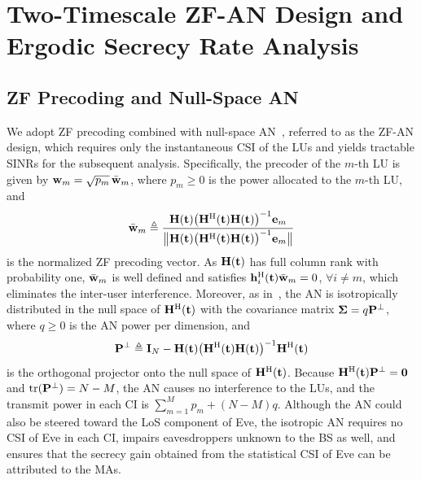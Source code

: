 \documentclass[journal]{IEEEtran}
\newcommand{\rev}[1]{{\color{red}#1}}
\newcommand{\rev}[1]{#1}
\begin{document}
\section{Two-Timescale ZF-AN Design and Ergodic Secrecy Rate Analysis}\label{sec:analysis}

\subsection{ZF Precoding and Null-Space AN}\label{sec:zfan}

We adopt ZF precoding combined with null-space AN~\cite{Zhou2010,ZhuTWC2014}, referred to as the ZF-AN design, which requires only the instantaneous CSI of the LUs and yields tractable SINRs for the subsequent analysis. Specifically, the precoder of the $m$-th LU is given by $\mathbf{w}_m=\sqrt{p_m}\,\bar{\mathbf{w}}_m$, where $p_m\ge0$ is the power allocated to the $m$-th LU, and
\begin{equation}\label{eq:zf}
\bar{\mathbf{w}}_m\triangleq\frac{\mathbf{H}(\mathbf{t})\big(\mathbf{H}^{\mathrm H}(\mathbf{t})\mathbf{H}(\mathbf{t})\big)^{-1}\mathbf{e}_m}{\big\|\mathbf{H}(\mathbf{t})\big(\mathbf{H}^{\mathrm H}(\mathbf{t})\mathbf{H}(\mathbf{t})\big)^{-1}\mathbf{e}_m\big\|}
\end{equation}
is the normalized ZF precoding vector. As $\mathbf{H}(\mathbf{t})$ has full column rank with probability one, $\bar{\mathbf{w}}_m$ is well defined and satisfies $\mathbf{h}_i^{\mathrm H}(\mathbf{t})\bar{\mathbf{w}}_m=0$, $\forall i\neq m$, which eliminates the inter-user interference. Moreover, as in~\cite{Zhou2010,ZhuTWC2014}, the AN is isotropically distributed in the null space of $\mathbf{H}^{\mathrm H}(\mathbf{t})$ with the covariance matrix $\boldsymbol{\Sigma}=q\mathbf{P}^{\perp}$, where $q\ge0$ is the AN power per dimension, and
\begin{equation}\label{eq:an}
\mathbf{P}^{\perp}\triangleq\mathbf{I}_N-\mathbf{H}(\mathbf{t})\big(\mathbf{H}^{\mathrm H}(\mathbf{t})\mathbf{H}(\mathbf{t})\big)^{-1}\mathbf{H}^{\mathrm H}(\mathbf{t})
\end{equation}
is the orthogonal projector onto the null space of $\mathbf{H}^{\mathrm H}(\mathbf{t})$. Because $\mathbf{H}^{\mathrm H}(\mathbf{t})\mathbf{P}^{\perp}=\mathbf 0$ and $\mathrm{tr}(\mathbf{P}^{\perp})=N-M$, the AN causes no interference to the LUs, and the transmit power in each CI is $\sum_{m=1}^Mp_m+(N-M)q$. \rev{Although the AN could also be steered toward the LoS component of Eve, the isotropic AN requires no CSI of Eve in each CI, impairs eavesdroppers unknown to the BS as well, and ensures that the secrecy gain obtained from the statistical CSI of Eve can be attributed to the MAs.}
\end{document}
